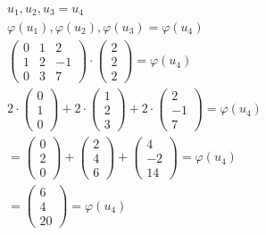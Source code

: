 \begin{align*}
    u_1, u_2, u_3 = u_4                                                                  \\
    \varphi(u_1), \varphi(u_2), \varphi(u_3) = \varphi(u_4)                              \\
    \begin{pmatrix}
        0 & 1 & 2 \\ 1 & 2 & -1 \\ 0 & 3 & 7
    \end{pmatrix} \cdot \begin{pmatrix}
                            2 \\ 2 \\ 2
                        \end{pmatrix} = \varphi(u_4)                                     \\
    2 \cdot \begin{pmatrix}
                0 \\ 1 \\ 0
            \end{pmatrix} + 2 \cdot \begin{pmatrix}
                                        1 \\ 2 \\ 3
                                    \end{pmatrix} + 2 \cdot \begin{pmatrix}
                                                                2 \\ -1 \\ 7
                                                            \end{pmatrix} = \varphi(u_4) \\
    = \begin{pmatrix}
          0 \\ 2 \\ 0
      \end{pmatrix} + \begin{pmatrix}
                          2 \\ 4 \\ 6
                      \end{pmatrix} + \begin{pmatrix}
                                          4 \\ -2 \\ 14
                                      \end{pmatrix} = \varphi(u_4)                       \\
    = \begin{pmatrix}
          6 \\ 4 \\ 20
      \end{pmatrix} = \varphi(u_4)
\end{align*}

